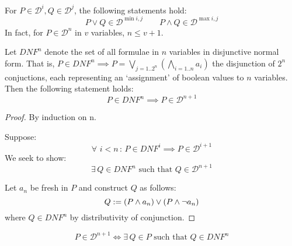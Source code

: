     \begin{corollary*}
        For $P \in \mathcal{D}^i, Q \in \mathcal{D}^j$, the following statements hold:
        \begin{equation*}
            P \vee Q \in \mathcal{D}^{\min{i, j}}
            \qquad
            P \wedge Q \in \mathcal{D}^{\max{i, j}}
        \end{equation*}
        In fact, for $P \in \mathcal{D}^n$ in $v$ variables, $n \leq v + 1$.
    \end{corollary*}


    \begin{proposition}
        Let $\textit{DNF}^n$ denote the set of all formulae in $n$ variables in disjunctive normal form.
        That is, $P \in \textit{DNF}^n \implies P = \bigvee_{j = 1 .. 2^n} (\bigwedge_{i = 1 .. n} a_i)$ the disjunction of $2^n$ conjuctions, each representing an `assignment' of boolean values to $n$ variables.
        Then the following statement holds:
        \begin{equation*}
            P \in \textit{DNF}^n \implies P \in \mathcal{D}^{n+1}
        \end{equation*}
    \end{proposition}

    \begin{proof}
        By induction on n.

        Suppose:
        \begin{equation*}
            \forall \,\, i < n \,:\, P \in \textit{DNF}^i \implies P \in \mathcal{D}^{i+1}
        \end{equation*}
        We seek to show:
        \begin{equation*}
            \exists \, Q \in \textit{DNF}^n \text{ such that } Q \in \mathcal{D}^{n+1}
        \end{equation*}
        
        Let $a_n$ be fresh in $P$ and construct $Q$ as follows:
        \begin{equation*}
            Q := (P \wedge a_n) \vee (P \wedge \neg a_n)
        \end{equation*}
        where $Q \in \textit{DNF}^n$ by distributivity of conjunction.
    \end{proof}

    \begin{proposition*}
        
        \begin{equation*}
            P \in \mathcal{D}^{n+1} \iff \exists \, Q \in P \text{ such that } Q \in DNF^{n}
        \end{equation*}
    \end{proposition*}

    
    \begin{remarks}
        \citet{tableaux-for-logic-of-proofs}
        \citet{connection-based-proof-method}
    \end{remarks}
